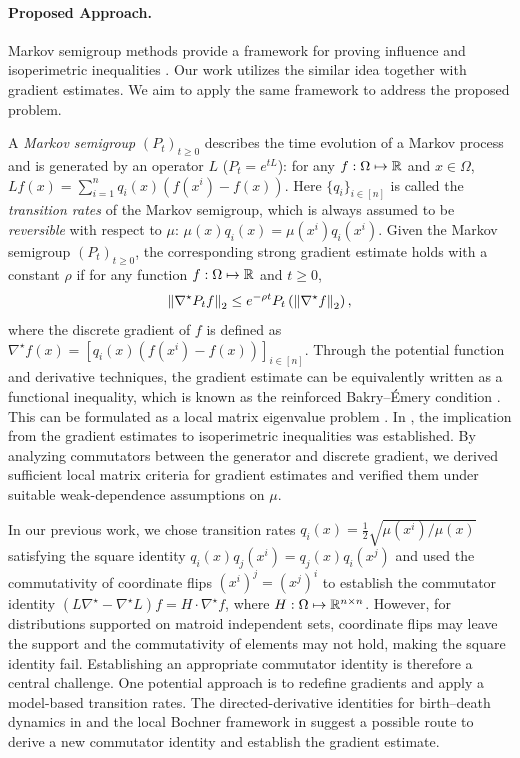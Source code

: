 \paragraph{Proposed Approach.}
Markov semigroup methods provide a framework for proving influence
and isoperimetric inequalities \cite{CorderoErausquinLedoux12,ODonnellWimmer13,IvanisviliZhang26}.
Our work \cite{chen2026discrete} utilizes the similar idea together with gradient estimates.
We aim to apply the same framework to address the proposed problem.

A \emph{Markov semigroup} $(P_t)_{t\geq 0}$ describes the time evolution of a Markov process and is generated by an operator $L$ ($P_t = e^{tL}$): for any $f: \Omega\mapsto \mathbb{R}$ and $x\in\Omega$, $Lf(x) = \sum_{i=1}^n q_i(x)(f(x^i)-f(x))$.
Here $\{q_i\}_{i\in[n]}$ is called the \emph{transition rates} of the Markov semigroup, which is always assumed to be \emph{reversible} with respect to $\mu$: $\mu(x)q_i(x)=\mu(x^i)q_i(x^i)$.
Given the Markov semigroup $(P_t)_{t\geq 0}$, the corresponding strong gradient estimate holds with a constant $\rho$ if for any function $f:\Omega\mapsto\mathbb{R}$ and $t\geq 0$,
$$
    \left\lVert \nabla^\star P_t f \right\rVert_2 \leq e^{-\rho t}P_t\left(\left\lVert \nabla^\star f \right\rVert_2\right),
$$ 
where the discrete gradient of $f$ is defined as $\nabla^\star f(x) = [q_i(x)(f(x^i)-f(x))]_{i\in[n]}$.
Through the potential function and derivative techniques, the gradient estimate can be equivalently written as a functional inequality, which is known as the reinforced Bakry--\'Emery condition \cite{BakryEmery85}.
This can be formulated as a local matrix eigenvalue problem \cite{CKLP22}.
In \cite{chen2026discrete}, the implication from the gradient estimates to isoperimetric inequalities was established. 
By analyzing commutators between the generator and discrete gradient, we derived sufficient local matrix criteria for gradient estimates and verified them under suitable weak-dependence assumptions on $\mu$.

In our previous work, we chose transition rates $q_i(x) = \frac 12 \sqrt{\mu(x^i)/\mu(x)}$ satisfying the square identity $q_i(x)q_j(x^i) = q_j(x)q_i(x^j)$ and used the commutativity of coordinate flips $(x^i)^j = (x^j)^i$ to establish the commutator identity $(L\nabla^\star - \nabla^\star L)f= H\cdot \nabla^\star f$, where $H: \Omega\mapsto\mathbb{R}^{n\times n}$.
However, for distributions supported on matroid independent sets, coordinate flips may leave the support and the commutativity of elements may not hold, making the square identity fail.
Establishing an appropriate commutator identity is therefore a central challenge.
One potential approach is to redefine gradients and  apply a model-based transition rates.
The directed-derivative identities for birth--death dynamics in
\cite{gobel2026simple} and the local Bochner framework in
\cite{chen2026spectral} suggest a possible route to derive a new commutator identity and establish the gradient estimate.
